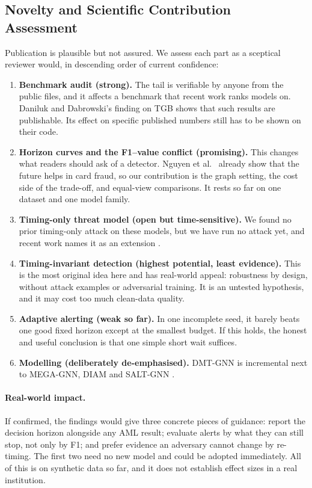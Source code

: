 \documentclass[11pt,a4paper]{article}
\begin{document}
\subsection{Novelty and Scientific Contribution Assessment}
Publication is plausible but not assured. We assess each part as a sceptical reviewer would, in descending order of current confidence:
\begin{enumerate}[leftmargin=*]
    \item \textbf{Benchmark audit (strong).} The tail is verifiable by anyone from the public files, and it affects a benchmark that recent work ranks models on. Daniluk and Dabrowski's finding on TGB \cite{daniluk2023global} shows that such results are publishable. Its effect on specific published numbers still has to be shown on their code.
    \item \textbf{Horizon curves and the F1--value conflict (promising).} This changes what readers should ask of a detector. Nguyen et al.\ \cite{nguyen2022future} already show that the future helps in card fraud, so our contribution is the graph setting, the cost side of the trade-off, and equal-view comparisons. It rests so far on one dataset and one model family.
    \item \textbf{Timing-only threat model (open but time-sensitive).} We found no prior timing-only attack on these models, but we have run no attack yet, and recent work names it as an extension \cite{heijmans2026robust}.
    \item \textbf{Timing-invariant detection (highest potential, least evidence).} This is the most original idea here and has real-world appeal: robustness by design, without attack examples or adversarial training. It is an untested hypothesis, and it may cost too much clean-data quality.
    \item \textbf{Adaptive alerting (weak so far).} In one incomplete seed, it barely beats one good fixed horizon except at the smallest budget. If this holds, the honest and useful conclusion is that one simple short wait suffices.
    \item \textbf{Modelling (deliberately de-emphasised).} DMT-GNN is incremental next to MEGA-GNN, DIAM and SALT-GNN \cite{bilgi2026mega,ding2024diam,losavio2026saltgnn}.
\end{enumerate}

\paragraph{Real-world impact.} If confirmed, the findings would give three concrete pieces of guidance: report the decision horizon alongside any AML result; evaluate alerts by what they can still stop, not only by F1; and prefer evidence an adversary cannot change by re-timing. The first two need no new model and could be adopted immediately. All of this is on synthetic data so far, and it does not establish effect sizes in a real institution.
\end{document}
